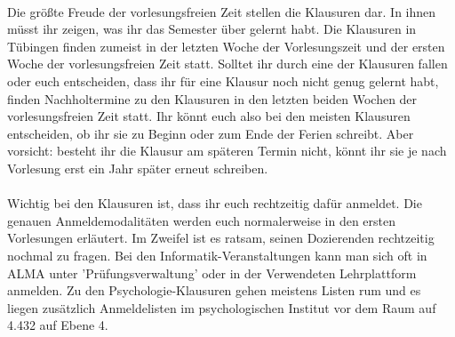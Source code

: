  \\
Die größte Freude der vorlesungsfreien Zeit stellen die Klausuren dar. In ihnen müsst ihr zeigen, was ihr das Semester über gelernt habt. Die Klausuren in Tübingen finden zumeist in der letzten Woche der Vorlesungszeit und der ersten Woche der vorlesungsfreien Zeit statt. Solltet ihr durch eine der Klausuren fallen oder euch entscheiden, dass ihr für eine Klausur noch nicht genug gelernt habt, finden Nachholtermine zu den Klausuren in den letzten beiden Wochen der vorlesungsfreien Zeit statt. Ihr könnt euch also bei den meisten Klausuren entscheiden, ob ihr sie zu Beginn oder zum Ende der Ferien schreibt. Aber vorsicht: besteht ihr die Klausur am späteren Termin nicht, könnt ihr sie je nach Vorlesung erst ein Jahr später erneut schreiben.\\
\\
Wichtig bei den Klausuren ist, dass ihr euch rechtzeitig dafür anmeldet. Die genauen Anmeldemodalitäten werden euch normalerweise in den ersten Vorlesungen erläutert. Im Zweifel ist es ratsam, seinen Dozierenden rechtzeitig nochmal zu fragen. Bei den Informatik-Veranstaltungen kann man sich oft in ALMA unter 'Prüfungsverwaltung' oder in der Verwendeten Lehrplattform anmelden. Zu den Psychologie-Klausuren gehen meistens Listen rum und es liegen zusätzlich Anmeldelisten im psychologischen Institut vor dem Raum auf 4.432 auf Ebene 4.

